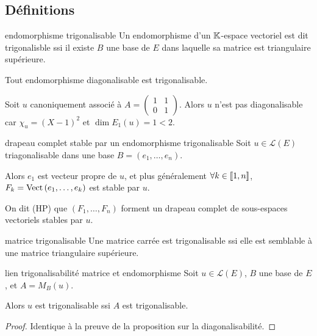 \subsection{Définitions}

\begin{definition}{endomorphisme trigonalisable}{}
    Un endomorphisme d'un $\mathbb{K}$-espace vectoriel est dit trigonalisble ssi il existe 
    $B$ une base de $E$ dans laquelle sa matrice est triangulaire supérieure.
\end{definition}

\begin{exemple}
    Tout endomorphisme diagonalisable est trigonalisable.

    Soit $u$ canoniquement associé à $A = \begin{pmatrix}
        1 & 1 \\
        0 & 1
    \end{pmatrix}$. Alors $u$ n'est pas diagonalisable car
    $\chi_u = (X - 1)^2$ et $\dim E_1(u) = 1 < 2$.
\end{exemple}

\begin{propositionnt}{drapeau complet stable par un endomorphisme trigonalisable}{}
    Soit $u \in \mathscr L(E)$ triagonalisable dans une base $B = (e_1, \ldots, e_n)$.

    Alors $e_1$ est vecteur propre de $u$, et plus généralement 
    $\forall k \in [\![1, n]\!]$, $F_k = \operatorname{Vect} \,(e_1, \ldots, e_k)$ est stable par $u$.

    On dit (HP) que $(F_1, \dots, F_n)$ forment un drapeau complet de sous-espaces vectoriels stables par $u$.
\end{propositionnt}

\begin{definition}{matrice trigonalisable}{}
    Une matrice carrée est trigonalisable ssi elle est semblable à une matrice triangulaire supérieure.
\end{definition}

\begin{proposition}{lien trigonalisabilité matrice et endomorphisme}{}
    Soit $u \in \mathscr L(E)$, $B$ une base de $E$, et $A = M_B(u)$.

    Alors $u$ est trigonalisable ssi $A$ est trigonalisable.
\end{proposition}

\begin{proof}
    Identique à la preuve de la proposition sur la diagonalisabilité.
\end{proof}

